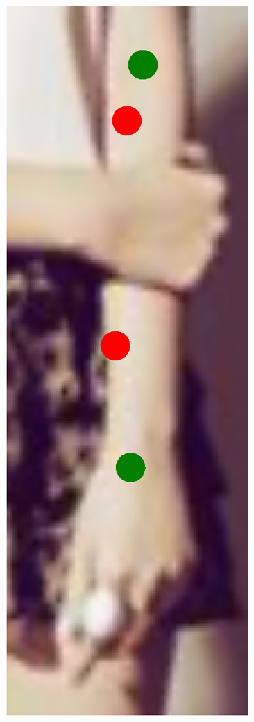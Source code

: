 \begin{figure}[!t]
    \includegraphics[height=\fh]{resources/Fixing/fix_8}
    \hfill

\end{figure}
